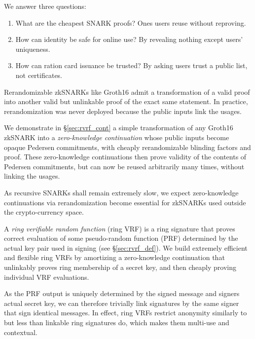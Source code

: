 
We answer three questions:
\begin{enumerate}
\item
What are the cheapest SNARK proofs?  \quad
Ones users reuse without reproving.
\item
How can identity be safe for online use?  \quad
By revealing nothing except users' uniqueness.
\item
How can ration card issuance be trusted?  \quad
By asking users trust a public list, not certificates.
\end{enumerate}


Rerandomizable zkSNARKs like Groth16 \cite{Groth16} admit a
transformation of a valid proof into another valid but unlinkable
proof of the exact same statement.  In practice, rerandomization
was never deployed because the public inputs link the usages.

We demonstrate in \S\ref{sec:rvrf_cont} a simple transformation of
any Groth16 zkSNARK into a {\it zero-knowledge continuation} whose
public inputs become opaque Pedersen commitments, with cheaply
rerandomizable blinding factors and proof.
These zero-knowledge continuations then prove validity of the contents
of Pedersen commitments, but can now be reused arbitrarily many times,
without linking the usages. 

As recursive SNARKs shall remain extremely slow,
we expect zero-knowledge continuations via rerandomization become
essential for zkSNARKs used outside the crypto-currency space.

\smallskip 

A {\it ring verifiable random function} (ring VRF) is a ring signature
that proves correct evaluation of some pseudo-random function (PRF)
determined by the actual key pair used in signing (see \S\ref{sec:rvrf_def}).
We build extremely efficient and flexible ring VRFs by amortizing a
zero-knowledge continuation that unlinkably proves ring membership
of a secret key, and then cheaply proving individual VRF evaluations.

As the PRF output is uniquely determined by the signed message and
signers actual secret key, we can therefore trivially link signatures
by the same signer that sign identical messages.
In effect, ring VRFs restrict anonymity similarly to but less than
 linkable ring signatures do, which makes them multi-use and contextual.

